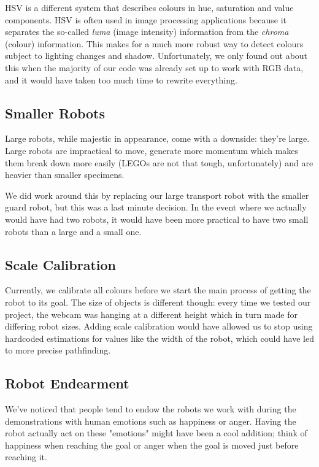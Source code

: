 \documentclass[10pt,twocolumn]{scrartcl}
\begin{document}
HSV is a different system that describes colours in hue, saturation and value components. HSV is often used in image processing applications because it separates the so-called \textit{luma} (image intensity) information from the \textit{chroma} (colour) information. This makes for a much more robust way to detect colours subject to lighting changes and shadow. Unfortunately, we only found out about this when the majority of our code was already set up to work with RGB data, and it would have taken too much time to rewrite everything.

\subsection{Smaller Robots}
Large robots, while majestic in appearance, come with a downside: they're large. Large robots are impractical to move, generate more momentum which makes them break down more easily (LEGOs are not that tough, unfortunately) and are heavier than smaller specimens. 

We did work around this by replacing our large transport robot with the smaller guard robot, but this was a last minute decision. In the event where we actually would have had two robots, it would have been more practical to have two small robots than a large and a small one.

\subsection{Scale Calibration}
Currently, we calibrate all colours before we start the main process of getting the robot to its goal. The size of objects is different though: every time we tested our project, the webcam was hanging at a different height which in turn made for differing robot sizes. Adding scale calibration would have allowed us to stop using hardcoded estimations for values like the width of the robot, which could have led to more precise pathfinding.

\subsection{Robot Endearment}
We've noticed that people tend to endow the robots we work with during the demonstrations with human emotions such as happiness or anger. Having the robot actually act on these "emotions" might have been a cool addition; think of happiness when reaching the goal or anger when the goal is moved just before reaching it.
\end{document}

